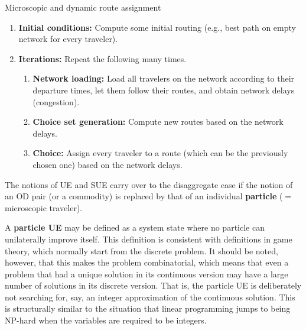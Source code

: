\begin{algorithm}[H]
\label{dynamic-micro-routes}

\caption{Microscopic and dynamic route assignment}

\begin{enumerate}

\item \textbf{Initial conditions:} Compute some initial routing (e.g., best path on empty network
  for every traveler).

\item \textbf{Iterations:} Repeat the following many times.

\begin{enumerate}

\item \textbf{Network loading:} Load all travelers on the network
  according to their departure times, let them follow their
  routes, and obtain network delays (congestion).

\item \textbf{Choice set generation:} Compute new routes based on the
  network delays.

\item \textbf{Choice:} Assign every traveler to a route 
  (which can be the previously chosen one) based on the network delays.

\end{enumerate} %

\end{enumerate}

\end{algorithm}

The notions of UE and SUE carry over to the disaggregate case if the notion of an OD pair (or a commodity) is replaced by that of an individual \textbf{particle} ($=$ microscopic traveler).

A \textbf{particle UE} may be defined as a system state where no
particle can unilaterally improve itself. 
%
This definition is consistent with definitions in game theory, which
normally start from the discrete problem.
%
It should be noted, however, that this makes the problem
combinatorial, which means that even a problem that had a unique
solution in its continuous version may have a large number of
solutions in its discrete version.  That is, the particle UE is
deliberately not searching for, say, an integer approximation of the
continuous solution.
%
This is structurally similar to the situation that linear programming
jumps to being NP-hard when the variables are required to be
integers.  

